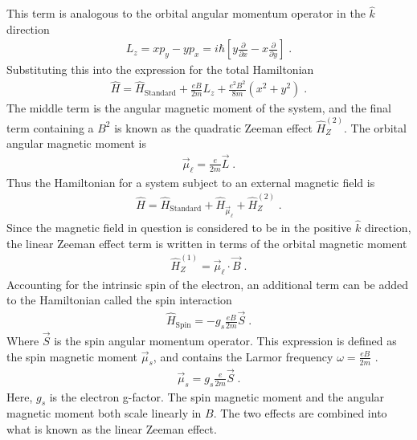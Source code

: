         \noindent This term is analogous to the orbital angular momentum operator in the $\hat{k}$ direction 
        \begin{align}
            L_z = xp_y - yp_x = i\hbar \left[y \frac{\partial}{\partial x} - x \frac{\partial}{\partial y} \right]\;.
        \end{align}
        \noindent Substituting this into the expression for the total Hamiltonian
        \begin{align}
            \hat{H} =  \hat{H}_{\text{Standard}} + \frac{eB}{2m} L_z + \frac{e^2B^2}{8m} \left(x^2 + y^2\right)\;.
        \end{align}
        \noindent The middle term is the angular magnetic moment of the system, and the final term containing a $B^2$ is known as the quadratic Zeeman effect $\hat{H}_Z^{(2)}$. The orbital angular magnetic moment is \cite{Basdevant_Dalibard_2002}
        \begin{align}
            \vec{\mu}_\ell = \frac{e}{2m} \vec{L}\;.
        \end{align}
        \noindent Thus the Hamiltonian for a system subject to an external magnetic field is
        \begin{align}
            \hat{H} =  \hat{H}_{\text{Standard}} + \hat{H}_{\vec{\mu}_\ell} + \hat{H}_Z^{(2)} \;.
        \end{align}
        \noindent Since the magnetic field in question is considered to be in the positive $\hat{k}$ direction, the linear Zeeman effect term is written in terms of the orbital magnetic moment 
        \begin{align}
            \hat{H}_Z^{(1)} = \vec{\mu}_\ell \cdot \vec{B}\;.
        \end{align}
        \noindent Accounting for the intrinsic spin of the electron, an additional term can be added to the Hamiltonian called the spin interaction \cite{Sakurai_Napolitano_2020}
        \begin{align}
            \hat{H}_{\text{Spin}} = -g_s \frac{eB}{2m} \vec{S}\;.
        \end{align}
        \noindent Where $\vec{S}$ is the spin angular momentum operator. This expression is defined as the spin magnetic moment $\vec{\mu}_s$, and contains the Larmor frequency $\omega = \frac{eB}{2m}$ \cite{Foot_2005}.
        \begin{align}
            \vec{\mu}_s = g_s \frac{e}{2m} \vec{S}\;.
        \end{align}
        \noindent Here, $g_s$ is the electron g-factor. The spin magnetic moment and the angular magnetic moment both scale linearly in $B$. The two effects are combined into what is known as the linear Zeeman effect.
